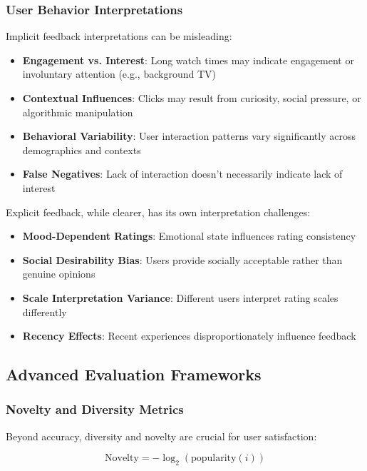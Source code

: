 \documentclass[acmsmall,review,anonymous]{acmart}
\begin{document}
\subsubsection{User Behavior Interpretations}
Implicit feedback interpretations can be misleading:

\begin{itemize}
    \item \textbf{Engagement vs. Interest}: Long watch times may indicate engagement or involuntary attention (e.g., background TV)
    \item \textbf{Contextual Influences}: Clicks may result from curiosity, social pressure, or algorithmic manipulation
    \item \textbf{Behavioral Variability}: User interaction patterns vary significantly across demographics and contexts
    \item \textbf{False Negatives}: Lack of interaction doesn't necessarily indicate lack of interest
\end{itemize}

Explicit feedback, while clearer, has its own interpretation challenges:

\begin{itemize}
    \item \textbf{Mood-Dependent Ratings}: Emotional state influences rating consistency
    \item \textbf{Social Desirability Bias}: Users provide socially acceptable rather than genuine opinions
    \item \textbf{Scale Interpretation Variance}: Different users interpret rating scales differently
    \item \textbf{Recency Effects}: Recent experiences disproportionately influence feedback
\end{itemize}

\subsection{Advanced Evaluation Frameworks}

\subsubsection{Novelty and Diversity Metrics}

Beyond accuracy, diversity and novelty are crucial for user satisfaction:

\begin{equation}
\text{Novelty} = -\log_2(\text{popularity}(i))
\label{eq:novelty}
\end{equation}
\end{document}
